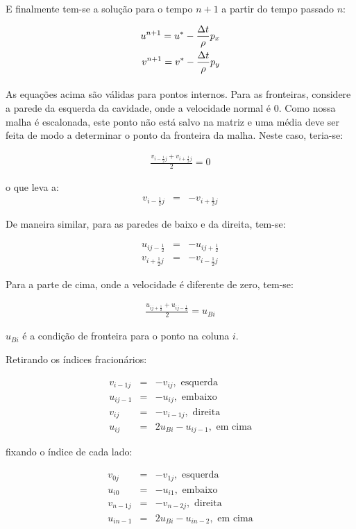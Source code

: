 \documentclass[poisson.tex]{subfiles}
\begin{document}
\paragraph{} E finalmente tem-se a solução para o tempo $n+1$ a partir do tempo passado $n$:

\begin{eqnarray}
{u}^{n+1}={u}^*-\frac{\Delta t}{\rho}p_{x}\\
{v}^{n+1}={v}^*-\frac{\Delta t}{\rho}p_{y}
\end{eqnarray}
\paragraph{} As equações acima são válidas para pontos internos. Para as fronteiras, considere a parede da esquerda da cavidade, onde a velocidade normal é 0. Como nossa malha é escalonada, este ponto não está salvo na matriz e uma média deve ser feita de modo a determinar o ponto da fronteira da malha. Neste caso, teria-se:

\begin{eqnarray*}
\frac{v_{i-\frac{1}{2}j}+v_{i+\frac{1}{2}j}}{2}=0
\end{eqnarray*}

o que leva a:
\begin{eqnarray}
v_{i-\frac{1}{2}j} &=& -v_{i+\frac{1}{2}j}
\end{eqnarray}

De maneira similar, para as paredes de baixo e da direita, tem-se:

\begin{eqnarray}
u_{ij-\frac{1}{2}}&=&-u_{ij+\frac{1}{2}}\\
v_{i+\frac{1}{2}j} &=& -v_{i-\frac{1}{2}j}
\end{eqnarray}

Para a parte de cima, onde a velocidade é diferente de zero, tem-se:

\begin{eqnarray*}
\frac{u_{ij+\frac{1}{2}}+u_{ij-\frac{1}{2}}}{2}=u_{Bi}
\end{eqnarray*}

$u_{Bi}$ é a condição de fronteira para o ponto na coluna $i$.


Retirando os índices fracionários:

\begin{eqnarray}
v_{i-1j} &=& -v_{ij},\,\, \textrm{esquerda}\\
u_{ij-1}&=&-u_{ij},\,\, \textrm{embaixo} \\
v_{ij} &=& -v_{i-1j},\,\, \textrm{direita}\\
u_{ij} &=& 2u_{Bi}-u_{ij-1},\,\, \textrm{em cima}
\end{eqnarray}

fixando o índice de cada lado:

\begin{eqnarray}
v_{0j} &=& -v_{1j},\,\, \textrm{esquerda}\\
u_{i0}&=&-u_{i1},\,\, \textrm{embaixo} \\
v_{n-1j} &=& -v_{n-2j},\,\, \textrm{direita}\\
u_{in-1} &=& 2u_{Bi}-u_{in-2},\,\, \textrm{em cima}
\end{eqnarray}
\end{document}
